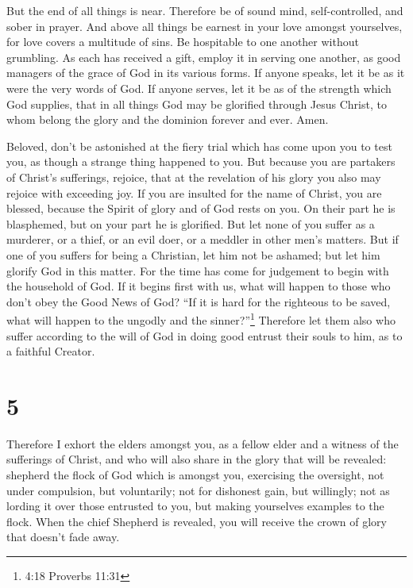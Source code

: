  But the end of all things is near. Therefore be of sound
mind, self-controlled, and sober in prayer.  And above all
things be earnest in your love amongst yourselves, for love covers a
multitude of sins.  Be hospitable to one another without
grumbling.  As each has received a gift, employ it in
serving one another, as good managers of the grace of God in its various
forms.  If anyone speaks, let it be as it were the very
words of God. If anyone serves, let it be as of the strength which God
supplies, that in all things God may be glorified through Jesus Christ,
to whom belong the glory and the dominion forever and ever. Amen.

 Beloved, don't be astonished at the fiery trial which has
come upon you to test you, as though a strange thing happened to you.
 But because you are partakers of Christ's sufferings,
rejoice, that at the revelation of his glory you also may rejoice with
exceeding joy.  If you are insulted for the name of Christ,
you are blessed, because the Spirit of glory and of God rests on you. On
their part he is blasphemed, but on your part he is glorified.
 But let none of you suffer as a murderer, or a thief, or
an evil doer, or a meddler in other men's matters.  But if
one of you suffers for being a Christian, let him not be ashamed; but
let him glorify God in this matter.  For the time has come
for judgement to begin with the household of God. If it begins first
with us, what will happen to those who don't obey the Good News of God?
 ``If it is hard for the righteous to be saved, what will
happen to the ungodly and the sinner?''\footnote{4:18 Proverbs 11:31}
 Therefore let them also who suffer according to the will
of God in doing good entrust their souls to him, as to a faithful
Creator.

\hypertarget{section-4}{%
\section{5}\label{section-4}}

 Therefore I exhort the elders amongst you, as a fellow
elder and a witness of the sufferings of Christ, and who will also share
in the glory that will be revealed:  shepherd the flock of
God which is amongst you, exercising the oversight, not under
compulsion, but voluntarily; not for dishonest gain, but willingly;
 not as lording it over those entrusted to you, but making
yourselves examples to the flock.  When the chief Shepherd
is revealed, you will receive the crown of glory that doesn't fade away.

